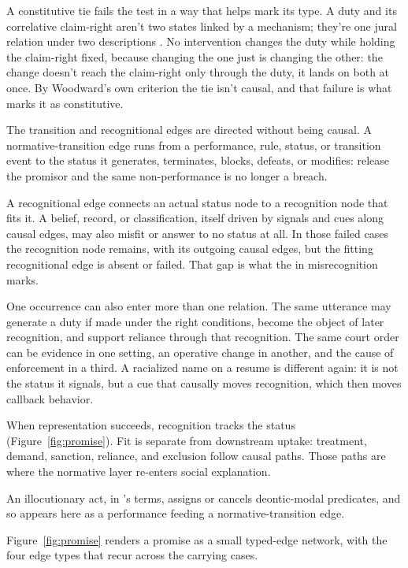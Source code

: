 \documentclass[12pt]{article}
\begin{document}
A constitutive tie fails the test in a way that helps mark its type. A duty and its correlative claim-right aren't two states linked by a mechanism; they're one jural relation under two descriptions \citep{hohfeld1913SomeFundamental}. No intervention changes the duty while holding the claim-right fixed, because changing the one just is changing the other: the change doesn't reach the claim-right only through the duty, it lands on both at once. By Woodward's own criterion the tie isn't causal, and that failure is what marks it as constitutive.

The transition and recognitional edges are directed without being causal. A normative-transition edge runs from a performance, rule, status, or transition event to the status it generates, terminates, blocks, defeats, or modifies: release the promisor and the same non-performance is no longer a breach.

A recognitional edge connects an actual status node to a recognition node that fits it. A belief, record, or classification, itself driven by signals and cues along causal edges, may also misfit or answer to no status at all. In those failed cases the recognition node remains, with its outgoing causal edges, but the fitting recognitional edge is absent or failed. That gap is what the  in misrecognition marks.

One occurrence can also enter more than one relation. The same utterance  may generate a duty if made under the right conditions, become the object of later recognition, and support reliance through that recognition. The same court order can be evidence in one setting, an operative change in another, and the cause of enforcement in a third. A racialized name on a resume is different again: it is not the status it signals, but a cue that causally moves recognition, which then moves callback behavior.

When representation succeeds, recognition tracks the status (Figure~\ref{fig:promise}). Fit is separate from downstream uptake: treatment, demand, sanction, reliance, and exclusion follow causal paths. Those paths are where the normative layer re-enters social explanation.

An illocutionary act, in \textcite{sbisa2023OnIllocutionaryTypes}'s terms, assigns or cancels deontic-modal predicates, and so appears here as a performance feeding a normative-transition edge.

Figure~\ref{fig:promise} renders a promise as a small typed-edge network, with the four edge types that recur across the carrying cases.
\end{document}
